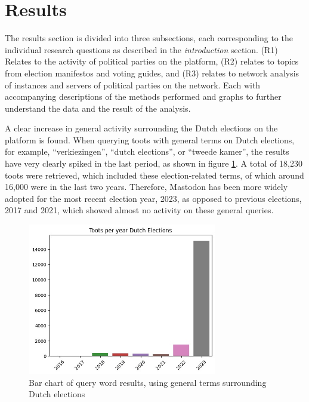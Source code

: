 \section{Results}
The results section is divided into three subsections, each corresponding to the individual research questions as described in the \textit{introduction} section. (R1) Relates to the activity of political parties on the platform, (R2) relates to topics from election manifestos and voting guides, and (R3) relates to network analysis of instances and servers of political parties on the network. Each with accompanying descriptions of the methods performed and graphs to further understand the data and the result of the analysis.

A clear increase in general activity surrounding the Dutch elections on the platform is found.
When querying toots with general terms on Dutch elections, for example, “verkiezingen”, “dutch elections”, or “tweede kamer”, the results have very clearly spiked in the last period, as shown in figure \ref{fig:electionstotal}. A total of 18,230 toots were retrieved, which included these election-related terms, of which around 16,000 were in the last two years.
Therefore, Mastodon has been more widely adopted for the most recent election year, 2023, as opposed to previous elections, 2017 and 2021, which showed almost no activity on these general queries.

\begin{figure}[ht]
  \centering
  \includegraphics[width=3.25in]{media/dutch-elections-mastodon.jpeg}
  \caption{Bar chart of query word results, using general terms surrounding Dutch elections}
  \label{fig:electionstotal}
\end{figure}

